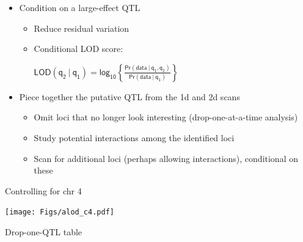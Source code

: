 \documentclass[12pt]{article}
\newcommand{\headsize}{\fontsize{35}{35} \selectfont}
\newcommand{\smallestsize}{\fontsize{18}{22} \selectfont}
\newcommand{\lod}{\text{LOD}}
\begin{document}
\hfill
\begin{minipage}{10in}
\begin{itemize}
\itemsep36pt
\item Condition on a large-effect QTL


{\color{myblue} \smallestsize
\begin{itemize}
\item Reduce residual variation
\item Conditional LOD score: 

\vspace{1cm}

\hspace{1in} $ \displaystyle{\mathsf{\lod(q_2 \ | \ q_1) = \text{log}_{10}
    \left\{\frac{\text{Pr}(\text{data} \ | \ q_1, q_2)}{
    \text{Pr}(\text{data} \ | \ q_1)}\right\} }}$
\end{itemize} }

\item Piece together the putative QTL from the 1d and 2d scans

{\color{myblue} \smallestsize
\begin{itemize}
\item Omit loci that no longer look interesting (drop-one-at-a-time analysis)
\item Study potential interactions among the identified loci
\item Scan for additional loci (perhaps allowing interactions), conditional on these
\end{itemize} }

\end{itemize}
\end{minipage}





\newpage

\headsize \color{myyellow}
\hfill \begin{minipage}{5.75in}
\centering
Controlling for chr 4
\end{minipage}

\vfill

\centerline{\texttt{[image: Figs/alod\_c4.pdf]}}





\newpage

\headsize \color{myyellow}
\hfill \begin{minipage}{5.75in}
\centering
Drop-one-QTL table
\end{minipage}
\end{document}
